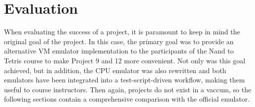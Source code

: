 \section{Evaluation} \label{evaluation}
When evaluating the success of a project, it is paramount to keep in mind the original goal of the project.
In this case, the primary goal was to provide an alternative VM emulator implementation to the participants of the Nand to Tetris course to make Project 9 and 12 more convenient.
Not only was this goal achieved, but in addition, the CPU emulator was also rewritten and both emulators have been integrated into a test-script-driven workflow, making them useful to course instructors.
Then again, projects do not exist in a vaccum, so the following sections contain a comprehensive comparison with the official emulator.

